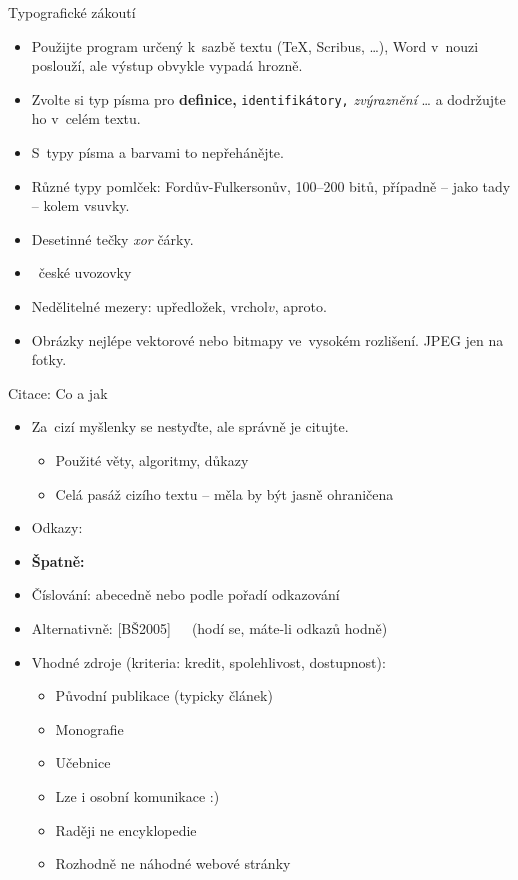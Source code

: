 \documentclass{beamer}
\begin{document}
\begin{frame}{Typografické zákoutí}

\begin{itemize}
\item Použijte program určený k~sazbě textu (\TeX, Scribus, \dots),
   Word v~nouzi poslouží, ale výstup obvykle vypadá hrozně.
\item Zvolte si typ písma pro {\bf definice,} {\tt identifikátory,} {\it zvýraznění\/} \dots{} a
   dodržujte ho v~celém textu.
\item S~typy písma a barvami to nepřehánějte.
\item Různé typy pomlček: Fordův-Fulkersonův, 100--200 bitů, případně -- jako tady -- kolem vsuvky.
\item Desetinné tečky {\it xor\/} čárky.
\item \clqq~české uvozovky \crqq
\item Nedělitelné mezery: u{\tt{}}předložek, vrchol{\tt{}}$v$, a{\tt{}}proto.
\item Obrázky nejlépe vektorové nebo bitmapy ve~vysokém rozlišení. JPEG jen na fotky.
\end{itemize}

\end{frame}

\begin{frame}{Citace: Co a jak}

\begin{itemize}
\item Za~cizí myšlenky se nestyďte, ale správně je citujte.
   \begin{itemize}
   \item Použité věty, algoritmy, důkazy
   \item Celá pasáž cizího textu -- měla by být jasně ohraničena
   \end{itemize}
\item Odkazy: 
\item {\bf Špatně:} 
\item Číslování: abecedně nebo podle pořadí odkazování
\item Alternativně: [BŠ2005]~~~(hodí se, máte-li odkazů hodně)
\end{itemize}

\begin{itemize}
\item Vhodné zdroje (kriteria: kredit, spolehlivost, dostupnost):
   \begin{itemize}
   \item Původní publikace (typicky článek)
   \item Monografie
   \item Učebnice
   \item Lze i osobní komunikace :)
   \item Raději ne encyklopedie
   \item Rozhodně ne náhodné webové stránky
   \end{itemize}
\end{itemize}

\end{frame}
\end{document}
